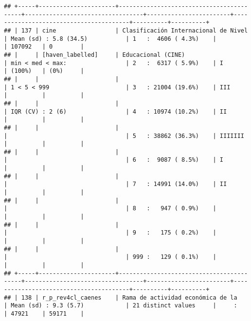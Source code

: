 \documentclass[]{article}
\begin{document}
\begin{verbatim}
## +-----+----------------------+------------------------------------------+----------------------------------+------------------------+----------------------------------------+----------+----------+
## | 137 | cine                 | Clasificación Internacional de Nivel     | Mean (sd) : 5.8 (34.5)           | 1   :  4606 ( 4.3%)    |                                        | 107092   | 0        |
## |     | [haven_labelled]     | Educacional (CINE)                       | min < med < max:                 | 2   :  6317 ( 5.9%)    | I                                      | (100%)   | (0%)     |
## |     |                      |                                          | 1 < 5 < 999                      | 3   : 21004 (19.6%)    | III                                    |          |          |
## |     |                      |                                          | IQR (CV) : 2 (6)                 | 4   : 10974 (10.2%)    | II                                     |          |          |
## |     |                      |                                          |                                  | 5   : 38862 (36.3%)    | IIIIIII                                |          |          |
## |     |                      |                                          |                                  | 6   :  9087 ( 8.5%)    | I                                      |          |          |
## |     |                      |                                          |                                  | 7   : 14991 (14.0%)    | II                                     |          |          |
## |     |                      |                                          |                                  | 8   :   947 ( 0.9%)    |                                        |          |          |
## |     |                      |                                          |                                  | 9   :   175 ( 0.2%)    |                                        |          |          |
## |     |                      |                                          |                                  | 999 :   129 ( 0.1%)    |                                        |          |          |
## +-----+----------------------+------------------------------------------+----------------------------------+------------------------+----------------------------------------+----------+----------+
## | 138 | r_p_rev4cl_caenes    | Rama de actividad económica de la        | Mean (sd) : 9.3 (5.7)            | 21 distinct values     |     :                                  | 47921    | 59171    |

\end{verbatim}
\end{document}

